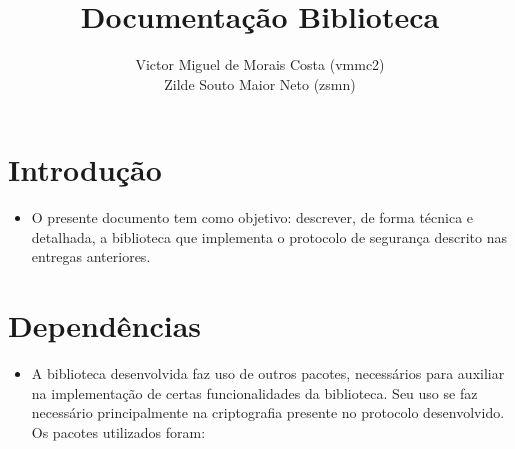 \documentclass[10pt]{article}
\title{\Huge \textbf{Documentação Biblioteca}}
\author{
Victor Miguel de Morais Costa (vmmc2) \\
Zilde Souto Maior Neto (zsmn)
}
\date{}
\begin{document}
\maketitle

\section{Introdução}
    \begin{itemize}
    \item O presente documento tem como objetivo: descrever, de forma técnica e detalhada, a biblioteca que implementa o protocolo de segurança descrito nas entregas anteriores.
    \end{itemize}

\section{Dependências}
    \begin{itemize}
    \item A biblioteca desenvolvida faz uso de outros pacotes, necessários para auxiliar na implementação de certas funcionalidades da biblioteca. Seu uso se faz necessário principalmente na criptografia presente no protocolo desenvolvido. Os pacotes utilizados foram:
    \end{itemize} 
    
\end{document}
